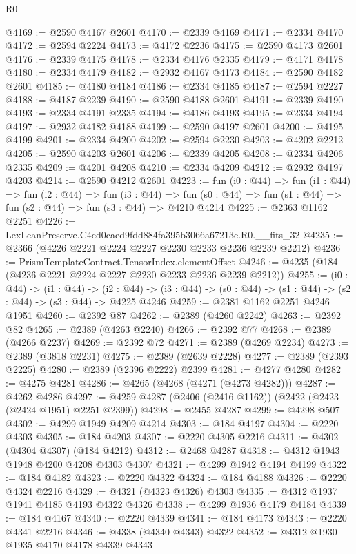 \begin{lexlean}{R0}
\begin{coremodule}
@4169 := @2590 @4167 @2601
@4170 := @2339 @4169
@4171 := @2334 @4170
@4172 := @2594 @2224
@4173 := @4172 @2236
@4175 := @2590 @4173 @2601
@4176 := @2339 @4175
@4178 := @2334 @4176 @2335
@4179 := @4171 @4178
@4180 := @2334 @4179
@4182 := @2932 @4167 @4173
@4184 := @2590 @4182 @2601
@4185 := @4180 @4184
@4186 := @2334 @4185
@4187 := @2594 @2227
@4188 := @4187 @2239
@4190 := @2590 @4188 @2601
@4191 := @2339 @4190
@4193 := @2334 @4191 @2335
@4194 := @4186 @4193
@4195 := @2334 @4194
@4197 := @2932 @4182 @4188
@4199 := @2590 @4197 @2601
@4200 := @4195 @4199
@4201 := @2334 @4200
@4202 := @2594 @2230
@4203 := @4202 @2212
@4205 := @2590 @4203 @2601
@4206 := @2339 @4205
@4208 := @2334 @4206 @2335
@4209 := @4201 @4208
@4210 := @2334 @4209
@4212 := @2932 @4197 @4203
@4214 := @2590 @4212 @2601
@4223 := fun (i0 : @44) =>
  fun (i1 : @44) =>
  fun (i2 : @44) =>
  fun (i3 : @44) =>
  fun (s0 : @44) => fun (s1 : @44) => fun (s2 : @44) => fun (s3 : @44) => @4210 @4214
@4225 := @2363 @1162 @2251
@4226 := LexLeanPreserve.C4cd0caed9fdd884fa395b3066a67213e.R0.__fits_32
@4235 := @2366 (@4226 @2221 @2224 @2227 @2230 @2233 @2236 @2239 @2212)
@4236 := PrismTemplateContract.TensorIndex.elementOffset
@4246 := @4235 (@184 (@4236 @2221 @2224 @2227 @2230 @2233 @2236 @2239 @2212))
@4255 := (i0 : @44) ->
  (i1 : @44) ->
  (i2 : @44) -> (i3 : @44) -> (s0 : @44) -> (s1 : @44) -> (s2 : @44) -> (s3 : @44) -> @4225 @4246
@4259 := @2381 @1162 @2251 @4246 @1951
@4260 := @2392 @87
@4262 := @2389 (@4260 @2242)
@4263 := @2392 @82
@4265 := @2389 (@4263 @2240)
@4266 := @2392 @77
@4268 := @2389 (@4266 @2237)
@4269 := @2392 @72
@4271 := @2389 (@4269 @2234)
@4273 := @2389 (@3818 @2231)
@4275 := @2389 (@2639 @2228)
@4277 := @2389 (@2393 @2225)
@4280 := @2389 (@2396 @2222) @2399
@4281 := @4277 @4280
@4282 := @4275 @4281
@4286 := @4265 (@4268 (@4271 (@4273 @4282)))
@4287 := @4262 @4286
@4297 := @4259 @4287 (@2406 (@2416 @1162)) (@2422 (@2423 (@2424 @1951) @2251 @2399))
@4298 := @2455 @4287
@4299 := @4298 @507
@4302 := @4299 @1949 @4209 @4214
@4303 := @184 @4197
@4304 := @2220 @4303
@4305 := @184 @4203
@4307 := @2220 @4305 @2216
@4311 := @4302 (@4304 @4307) (@184 @4212)
@4312 := @2468 @4287
@4318 := @4312 @1943 @1948 @4200 @4208 @4303 @4307
@4321 := @4299 @1942 @4194 @4199
@4322 := @184 @4182
@4323 := @2220 @4322
@4324 := @184 @4188
@4326 := @2220 @4324 @2216
@4329 := @4321 (@4323 @4326) @4303
@4335 := @4312 @1937 @1941 @4185 @4193 @4322 @4326
@4338 := @4299 @1936 @4179 @4184
@4339 := @184 @4167
@4340 := @2220 @4339
@4341 := @184 @4173
@4343 := @2220 @4341 @2216
@4346 := @4338 (@4340 @4343) @4322
@4352 := @4312 @1930 @1935 @4170 @4178 @4339 @4343

\end{coremodule}
\end{lexlean}
